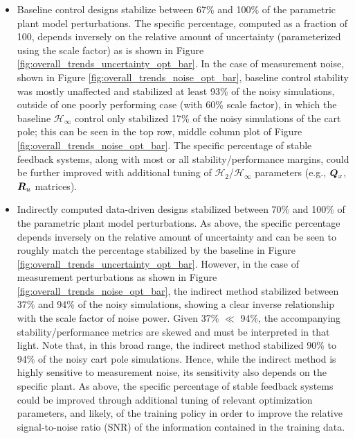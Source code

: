 \begin{itemize}
\item{Baseline control designs stabilize between 67\% and 100\% of the parametric plant model perturbations.  The specific percentage, computed as a fraction of 100, depends inversely on the relative amount of uncertainty (parameterized using the scale factor) as is shown in Figure \ref{fig:overall_trends_uncertainty_opt_bar}.  In the case of measurement noise, shown in Figure \ref{fig:overall_trends_noise_opt_bar}, baseline control stability was mostly unaffected and stabilized at least 93\% of the noisy simulations, outside of one poorly performing case (with 60\% scale factor), in which the baseline $\mathcal{H}_{\infty}$ control only stabilized 17\% of the noisy simulations of the cart pole; this can be seen in the top row, middle column plot of Figure \ref{fig:overall_trends_noise_opt_bar}.  The specific percentage of stable feedback systems, along with most or all stability/performance margins, could be further improved with additional tuning of $\mathcal{H}_{2}$/$\mathcal{H}_{\infty}$ parameters (e.g., $\vb*{Q}_{x}$, $\vb*{R}_{u}$ matrices).}
%
\item{Indirectly computed data-driven designs stabilized between 70\% and 100\% of the parametric plant model perturbations.  As above, the specific percentage depends inversely on the relative amount of uncertainty and can be seen to roughly match the percentage stabilized by the baseline in Figure \ref{fig:overall_trends_uncertainty_opt_bar}.  However, in the case of measurement perturbations as shown in Figure \ref{fig:overall_trends_noise_opt_bar}, the indirect method stabilized between 37\% and 94\% of the noisy simulations, showing a clear inverse relationship with the scale factor of noise power.  Given 37\% $\ll$ 94\%, the accompanying stability/performance metrics are skewed and must be interpreted in that light.  Note that, in this broad range, the indirect method stabilized 90\% to 94\% of the noisy cart pole simulations.  Hence, while the indirect method is highly sensitive to measurement noise, its sensitivity also depends on the specific plant.  As above, the specific percentage of stable feedback systems could be improved through additional tuning of relevant optimization parameters, and likely, of the training policy in order to improve the relative signal-to-noise ratio (SNR) of the information contained in the training data.}
%

\end{itemize}
